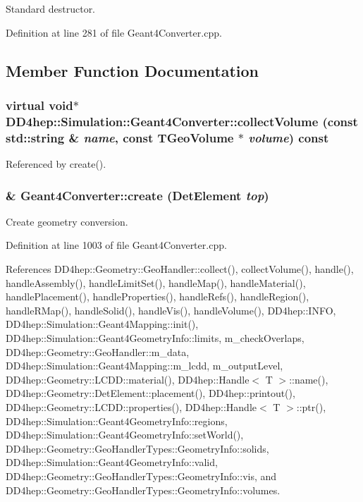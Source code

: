 Standard destructor. 

Definition at line 281 of file Geant4Converter.cpp.

\subsection{Member Function Documentation}
\hypertarget{class_d_d4hep_1_1_simulation_1_1_geant4_converter_a5351cedc11f4e67a8786a6c013ff7cb1}{
\subsubsection[{collectVolume}]{\setlength{\rightskip}{0pt plus 5cm}virtual void$\ast$ DD4hep::Simulation::Geant4Converter::collectVolume (const std::string \& {\em name}, \/  const TGeoVolume $\ast$ {\em volume}) const}}
\label{class_d_d4hep_1_1_simulation_1_1_geant4_converter_a5351cedc11f4e67a8786a6c013ff7cb1}


Referenced by create().\hypertarget{class_d_d4hep_1_1_simulation_1_1_geant4_converter_ab43bb402a64c6647e47f4706097f8990}{
\subsubsection[{create}]{ \& Geant4Converter::create ({\bf DetElement} {\em top})}}
\label{class_d_d4hep_1_1_simulation_1_1_geant4_converter_ab43bb402a64c6647e47f4706097f8990}


Create geometry conversion. 

Definition at line 1003 of file Geant4Converter.cpp.

References DD4hep::Geometry::GeoHandler::collect(), collectVolume(), handle(), handleAssembly(), handleLimitSet(), handleMap(), handleMaterial(), handlePlacement(), handleProperties(), handleRefs(), handleRegion(), handleRMap(), handleSolid(), handleVis(), handleVolume(), DD4hep::INFO, DD4hep::Simulation::Geant4Mapping::init(), DD4hep::Simulation::Geant4GeometryInfo::limits, m\_\-checkOverlaps, DD4hep::Geometry::GeoHandler::m\_\-data, DD4hep::Simulation::Geant4Mapping::m\_\-lcdd, m\_\-outputLevel, DD4hep::Geometry::LCDD::material(), DD4hep::Handle$<$ T $>$::name(), DD4hep::Geometry::DetElement::placement(), DD4hep::printout(), DD4hep::Geometry::LCDD::properties(), DD4hep::Handle$<$ T $>$::ptr(), DD4hep::Simulation::Geant4GeometryInfo::regions, DD4hep::Simulation::Geant4GeometryInfo::setWorld(), DD4hep::Geometry::GeoHandlerTypes::GeometryInfo::solids, DD4hep::Simulation::Geant4GeometryInfo::valid, DD4hep::Geometry::GeoHandlerTypes::GeometryInfo::vis, and DD4hep::Geometry::GeoHandlerTypes::GeometryInfo::volumes.

